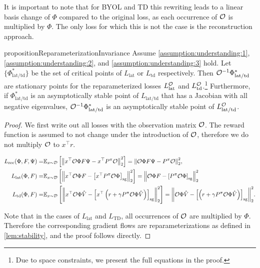 It is important to note that for BYOL and TD this rewriting leads to a linear basis change of $\Phi$ compared to the original loss, as each occurrence of ${\mathcal{O}}$ is multiplied by $\Phi$. The only loss for which this is not the case is the reconstruction approach.

\begin{restatable}{proposition}{ReparameterizationInvariance} 
Assume \autoref{assumption:understanding:1}, \autoref{assumption:understanding:2}, and \autoref{assumption:understanding:3} hold. Let $\{\Phi^*_\mathrm{lat/td}\}$ be the set of critical points of $L_\mathrm{lat}$ or $L_\mathrm{td}$ respectively.
Then ${\mathcal{O}}^{-1}\Phi^*_\mathrm{lat/td}$ are stationary points for the reparameterized losses $L_\mathrm{lat}^{\mathcal{O}}$ and $L_\mathrm{td}^{\mathcal{O}}$.\footnote{Due to space constraints, we present the full equations in the proof.} Furthermore, if $\Phi^*_\mathrm{lat/td}$ is an asymptotically stable point of $L_\mathrm{lat/td}$ that has a Jacobian with all negative eigenvalues, ${\mathcal{O}}^{-1}\Phi^*_\mathrm{lat/td}$ is an asymptotically stable point of $L_\mathrm{lat/td}^{\mathcal{O}}$.
\end{restatable}
\begin{proof}
We first write out all losses with the observation matrix ${\mathcal{O}}$. The reward function is assumed to not change under the introduction of ${\mathcal{O}}$, therefore we do not multiply ${\mathcal{O}}$ to $x^\top r$.

\begin{align*}
    L_{\text{rec}}(\Phi,F,\Psi) =& \mathbb{E}_{x \sim \mathcal{D}}\left[  \left\lVert x^\top {\mathcal{O}} \Phi F \Psi - x^\top {P^\pi}{\mathcal{O}} \right\rVert_2^2 \right] = {\left\lVert {\mathcal{O}} \Phi F \Psi - {P^\pi}{\mathcal{O}} \right\rVert_2^2}, \\
    L_{\text{lat}}(\Phi,F) =& \mathbb{E}_{x \sim \mathcal{D}}\left[  \left\lVert x^\top {\mathcal{O}} \Phi F - \left[x^\top {P^\pi} {\mathcal{O}} \Phi\right]_{\mathrm{sg}} \right\rVert_2^2 \right] = \left\lVert {\mathcal{O}} \Phi F - \left[{P^\pi} {\mathcal{O}} \Phi\right]_{\mathrm{sg}} \right\rVert_2^2 \\
    L_{\text{td}}(\Phi,F) =& \mathbb{E}_{x \sim \mathcal{D}}\left[  \left\lVert x^\top{\mathcal{O}}\Phi \hat{V} - \left[x^\top \left(r + \gamma P^\pi {\mathcal{O}}\Phi \hat{V}\right)\right]_{\mathrm{sg}} \right\rVert_2^2 \right] = {\left\lVert {\mathcal{O}}\Phi \hat{V} - \left[\left(r + \gamma P^\pi {\mathcal{O}}\Phi \hat{V}\right)\right]_{\mathrm{sg}} \right\rVert_2^2}.
\end{align*}

Note that in the cases of $L_{\text{lat}}$ and $L_\text{TD}$, all occurrences of ${\mathcal{O}}$ are multiplied by $\Phi$.
Therefore the corresponding gradient flows are reparameterizations as defined in \autoref{lem:stability}, and the proof follows directly.
\end{proof}


